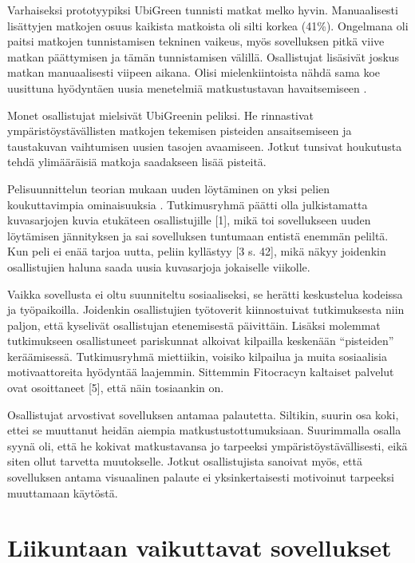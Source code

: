 \documentclass[finnish]{tktltiki2}
\theoremstyle{definition}
\theoremstyle{remark}
\begin{document}
Varhaiseksi prototyypiksi UbiGreen tunnisti matkat melko hyvin. Manuaalisesti lisättyjen matkojen osuus kaikista matkoista oli silti korkea (41\%).
Ongelmana oli paitsi matkojen tunnistamisen tekninen vaikeus, myös sovelluksen pitkä viive matkan päättymisen ja tämän tunnistamisen välillä.
Osallistujat lisäsivät joskus matkan manuaalisesti viipeen aikana.
Olisi mielenkiintoista nähdä sama koe uusittuna hyödyntäen uusia menetelmiä matkustustavan havaitsemiseen \cite{hemminki}.

Monet osallistujat mielsivät UbiGreenin peliksi. He rinnastivat ympäristöystävällisten matkojen tekemisen pisteiden ansaitsemiseen ja taustakuvan vaihtumisen uusien tasojen avaamiseen. Jotkut tunsivat houkutusta tehdä ylimääräisiä matkoja saadakseen lisää pisteitä. 

Pelisuunnittelun teorian mukaan uuden löytäminen on yksi pelien koukuttavimpia ominaisuuksia \cite[s.~90]{theoryoffun}\cite[s.~109]{gamedesign}. Tutkimusryhmä päätti olla julkistamatta kuvasarjojen kuvia etukäteen osallistujille [1], mikä toi sovellukseen uuden löytämisen jännityksen ja sai sovelluksen tuntumaan entistä enemmän peliltä. Kun peli ei enää tarjoa uutta, peliin kyllästyy [3 s. 42], mikä näkyy joidenkin osallistujien haluna saada uusia kuvasarjoja jokaiselle viikolle.

Vaikka sovellusta ei oltu suunniteltu sosiaaliseksi, se herätti keskustelua kodeissa ja työpaikoilla. Joidenkin osallistujien työtoverit kiinnostuivat tutkimuksesta niin paljon, että kyselivät osallistujan etenemisestä päivittäin. Lisäksi molemmat tutkimukseen osallistuneet pariskunnat alkoivat kilpailla keskenään “pisteiden” keräämisessä. Tutkimusryhmä miettiikin, voisiko kilpailua ja muita sosiaalisia motivaattoreita hyödyntää laajemmin. Sittemmin Fitocracyn kaltaiset palvelut ovat osoittaneet [5], että näin tosiaankin on.

Osallistujat arvostivat sovelluksen antamaa palautetta. Siltikin, suurin osa koki, ettei se muuttanut heidän aiempia matkustustottumuksiaan. Suurimmalla osalla syynä oli, että he kokivat matkustavansa jo tarpeeksi ympäristöystävällisesti, eikä siten ollut tarvetta muutokselle. Jotkut osallistujista sanoivat myös, että sovelluksen antama visuaalinen palaute ei yksinkertaisesti motivoinut tarpeeksi muuttamaan käytöstä.

\section{Liikuntaan vaikuttavat sovellukset}
\end{document}
